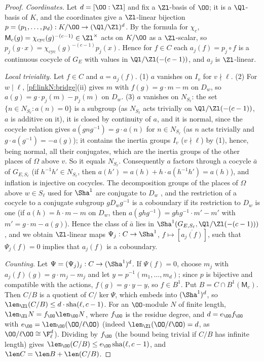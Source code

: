 \begin{proof}
\emph{Coordinates.} Let $d=[\OO:\Zl]$ and fix a $\Zl$-basis of $\OO$; it is a $\Ql$-basis of $K$, and the coordinates give a $\Zl$-linear
bijection $p=(p_1,\dots,p_d):K/\OO\to(\Ql/\Zl)^d$. By the formula for $\chi_c$, $\mathsf M_c(g)=\chi_{\mathrm{cyc}}(g)^{-(c-1)}\in\Zl^\times$ acts on $K/\OO$
as a $\Zl$-scalar, so $p_j(g\cdot x)=\chi_{\mathrm{cyc}}(g)^{-(c-1)}p_j(x)$. Hence for $f\in C$ each $a_j(f)=p_j\circ f$ is a continuous cocycle of $G_E$
with values in $\Ql/\Zl(-(c-1))$, and $a_j$ is $\Zl$-linear.

\emph{Local triviality.} Let $f\in C$ and $a=a_j(f)$. (1) $a$ vanishes on $I_v$ for $v\nmid\ell$. (2) For $w\mid\ell$, \cref{pf:linkN:bridge}(ii)
gives $m$ with $f(g)=g\cdot m-m$ on $D_w$, so $a(g)=g\cdot p_j(m)-p_j(m)$ on $D_w$. (3) $a$ vanishes on $N_{S_\ell}$: the set
$\{n\in N_{S_\ell}:a(n)=0\}$ is a subgroup (as $N_{S_\ell}$ acts trivially on $\Ql/\Zl(-(c-1))$, $a$ is additive on it), it is closed by
continuity of $a$, and it is normal, since the cocycle relation gives $a(gng^{-1})=g\cdot a(n)$ for $n\in N_{S_\ell}$ (as $n$ acts trivially
and $g\cdot a(g^{-1})=-a(g)$); it contains the inertia groups $I_v$ ($v\nmid\ell$) by (1), hence, being normal, all their conjugates, which are
the inertia groups of the other places of $\Omega$ above $v$. So it equals $N_{S_\ell}$. Consequently $a$ factors through a cocycle $\bar a$ of
$G_{E,S_\ell}$ (if $h^{-1}h'\in N_{S_\ell}$, then $a(h')=a(h)+h\cdot a(h^{-1}h')=a(h)$), and inflation is injective on cocycles. The decomposition groups of the places of $\Omega$ above
$w\in S_\ell$ used for $\Sha^1$ are conjugate to $D_w$ \cite[Ch.~I, Prop.~9.1]{Neukirch1999}, and the restriction of a cocycle to a conjugate
subgroup $gD_wg^{-1}$ is a coboundary if its restriction to $D_w$ is one (if $a(h)=h\cdot m-m$ on $D_w$, then
$a(ghg^{-1})=ghg^{-1}\cdot m'-m'$ with $m'=g\cdot m-a(g)$). Hence the class of $\bar a$ lies in $\Sha^1(G_{E,S_\ell},\Ql/\Zl(-(c-1)))$, and we
obtain $\Zl$-linear maps $\Psi_j:C\to\Sha^1$, $f\mapsto[\overline{a_j(f)}]$, such that $\Psi_j(f)=0$ implies that $a_j(f)$ is a coboundary.

\emph{Counting.} Let $\Psi=(\Psi_j)_j:C\to(\Sha^1)^d$. If $\Psi(f)=0$, choose $m_j$ with $a_j(f)(g)=g\cdot m_j-m_j$ and let $y=p^{-1}(m_1,\dots,m_d)$;
since $p$ is bijective and compatible with the actions, $f(g)=g\cdot y-y$, so $f\in B^1$. Put $B=C\cap B^1(\mathsf M_c)$. Then $C/B$ is a quotient of
$C/\ker\Psi$, which embeds into $(\Sha^1)^d$, so $\len_{\Zl}(C/B)\le d\cdot\mathrm{sha}(\ell,c-1)$. For an $\OO$-module $N$ of finite length,
$\len_{\Zl}N=f_\OO\len_\OO N$, where $f_\OO$ is the residue degree, and $d=e_\OO f_\OO$ with $e_\OO=\len_\OO(\OO/\ell\OO)$ (indeed
$\len_{\Zl}(\OO/\ell\OO)=d$, as $\OO/\ell\OO\cong\F_\ell^d$). Dividing by $f_\OO$ (the bound being trivial if $C/B$ has infinite length) gives
$\len_\OO(C/B)\le e_\OO\,\mathrm{sha}(\ell,c-1)$, and $\len C=\len B+\len(C/B)$.
\end{proof}

